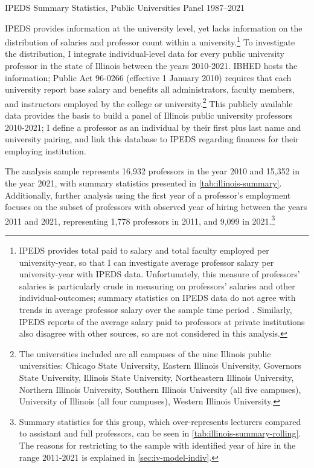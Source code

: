 \documentclass[notitlepage,12pt]{article}
\begin{document}
\begin{table}[h!]
    \singlespacing
    \centering
    \caption{IPEDS Summary Statistics, Public Universities Panel 1987--2021}
    \makebox[\textwidth][c]{}
    \label{tab:ipeds-summary}
\end{table}

IPEDS provides information at the university level, yet lacks information on the distribution of salaries and professor count within a university.\footnote{
    IPEDS provides total paid to salary and total faculty employed per university-year, so that I can investigate average professor salary per university-year with IPEDS data.
    Unfortunately, this measure of professors' salaries is particularly crude in measuring on professors' salaries and other individual-outcomes; summary statistics on IPEDS data do not agree with trends in average professor salary over the sample time period \citep{aau2021survey}.
    Similarly, IPEDS reports of the average salary paid to professors at private institutions also disagree with other sources, so are not considered in this analysis.
}
To investigate the distribution, I integrate individual-level data for every public university professor in the state of Illinois between the years 2010-2021.
IBHED hosts the information;
Public Act 96-0266 (effective 1 January 2010) requires that each university report base salary and benefits all administrators, faculty members, and instructors employed by the college or university.\footnote{
    The universities included are all campuses of the nine Illinois public universities: Chicago State University, Eastern Illinois University, Governors State University, Illinois State University, Northeastern Illinois University, Northern Illinois University, Southern Illinois University  (all five campuses), University of Illinois (all four campuses), Western Illinois University.
}
This publicly available data provides the basis to build a panel of Illinois public university professors 2010-2021; I define a professor as an individual by their first plus last name and university pairing, and link this database to IPEDS regarding finances for their employing institution.

The analysis sample represents 16,932 professors in the year 2010 and 15,352 in the year 2021, with summary statistics presented in \autoref{tab:illinois-summary}.
Additionally, further analysis using the first year of a professor's employment focuses on the subset of professors with observed year of hiring between the years 2011 and 2021, representing 1,778 professors in 2011, and 9,099 in 2021.\footnote{
    Summary statistics for this group, which over-represents lecturers compared to assistant and full professors, can be seen in \autoref{tab:illinois-summary-rolling}.
    The reasons for restricting to the sample with identified year of hire in the range 2011-2021 is explained in \autoref{sec:iv-model-indiv}.
}
\end{document}
